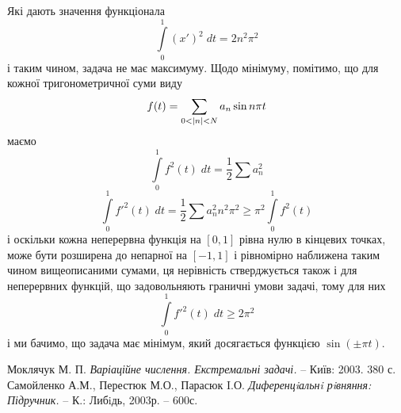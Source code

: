 \documentclass[12pt]{article} %
\newcommand{\dt}{\;dt}
\let\oldint\int
\renewcommand{\int}{\oldint\limits}
\begin{document}
	Які дають значення функціонала
	\[\int_0^1(x')^2\dt=2n^2\pi^2\]
	і таким чином, задача не має максимуму. Щодо мінімуму, помітимо, що для кожної тригонометричної суми виду
	\[f(t)=\sum_{0<\myabs{n}<N}a_n\sin n\pi t\]
	маємо
	\[\int_0^1f^2(t)\dt=\frac{1}{2}\sum a_n^2\]
	\[\int_0^1f'^2(t)\dt=\frac{1}{2}\sum{a_n^2n^2\pi^2}\geq\pi^2\int_0^1f^2(t)\]
	і оскільки кожна неперервна функція на $[0,1]$ рівна нулю в кінцевих точках, може
	бути розширена до непарної на $[-1,1]$ і рівномірно наближена таким чином вищеописаними сумами,
	ця нерівність стверджується також і для неперервних функцій, що задовольняють граничні умови задачі, тому для них
	\[\int_0^1f'^2(t)\dt\geq 2\pi^2\]
	і ми бачимо, що задача має мінімум, який досягається функцією $\sin(\pm\pi t)$.
\begin{thebibliography}{9}
Моклячук М. П. \emph{Варіаційне числення. Екстремальні задачі.} --
Київ: 2003. 380 с.
Самойленко А.М., Перестюк М.О., Парасюк I.О. \emph{Диференцiальнi рiвняння: Підручник.} -- К.: Либiдь, 2003р. -- 600с.
\end{thebibliography}
\end{document}
